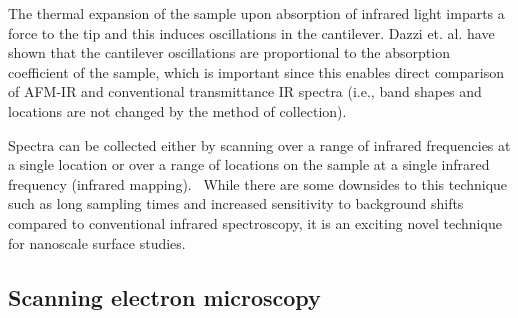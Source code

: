 The thermal expansion of the sample upon absorption of infrared light imparts a force to the tip and this induces oscillations in the cantilever. Dazzi et. al. have shown that the cantilever oscillations are proportional to the absorption coefficient of the sample, which is important since this enables direct comparison of AFM-IR and conventional transmittance IR spectra (i.e., band shapes and locations are not changed by the method of collection).~\autocite{dazzi2017,kurouski} 

Spectra can be collected either by scanning over a range of infrared frequencies at a single location or over a range of locations on the sample at a single infrared frequency (infrared mapping).~\autocite{dazzi2017,kurouski} While there are some downsides to this technique such as long sampling times and increased sensitivity to background shifts compared to conventional infrared spectroscopy, it is an exciting novel technique for nanoscale surface studies.

\subsection[Scanning electron microscopy]{Scanning electron microscopy}
\label{subsection1.2.2}




